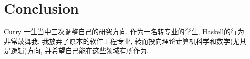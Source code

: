 \section{Conclusion}
Curry 一生当中三次调整自己的研究方向. 作为一名转专业的学生, Haskell的行为非常鼓舞我. 我放弃了原本的软件工程专业, 转而投向理论计算机科学和数学(尤其是逻辑)方向, 并希望自己能在这些领域有所作为. 
